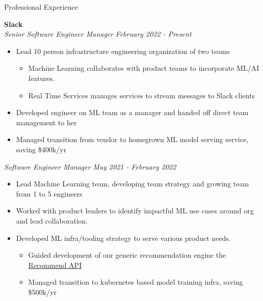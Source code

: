 \documentclass{resume} %
\begin{document}
\begin{rSection}{Professional Experience}

\vspace{0.2em}

{\bf Slack} \\
{\em Senior Software Engineer Manager} \hfill {\em February 2022 - Present}  \vspace{0.1em} 
\begin{itemize} \itemsep -0.2em
	\item Lead 10 person infrastructure engineering organization of two teams
	\vspace{-0.2em}
        \begin{itemize} \itemsep -0.2em
            \item Machine Learning collaborates with product teams to incorporate ML/AI features.
            \item Real Time Services manages services to stream messages to Slack clients
        \end{itemize}
    \item Developed engineer on ML team as a manager and handed off direct team management to her
    \item Managed transition from vendor to homegrown ML model serving service, saving \$400k/yr
\end{itemize}
{\em Software Engineer Manager} \hfill {\em May 2021 - February 2022} \vspace{0.1em} 
\begin{itemize} \itemsep -0.2em
	\item Lead Machine Learning team, developing team strategy and growing team from 1 to 5 engineers
	\item Worked with product leaders to identify impactful ML use cases around org and lead collaboration.
	\item Developed ML infra/tooling strategy to serve various product needs.
	\vspace{-0.2em}
        \begin{itemize} \itemsep -0.2em
            \item Guided development of our generic recommendation engine the \href{https://slack.engineering/recommend-api/}{Recommend API} 
            \item Managed transition to kubernetes based model training infra, saving \$500k/yr
        \end{itemize}
\end{itemize}

\end{rSection}
\end{document}
